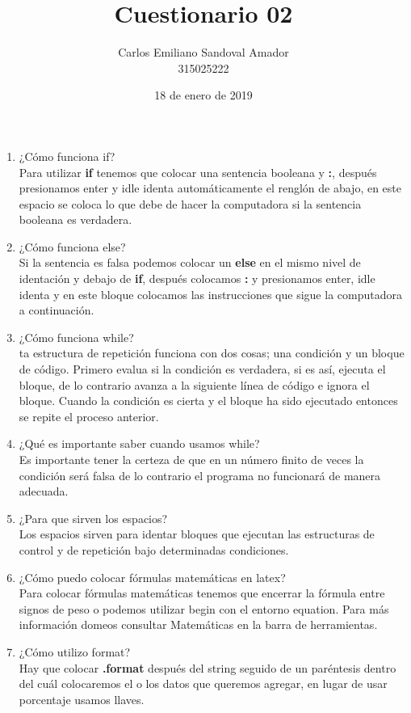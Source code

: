 \documentclass[letterpaper, 12pt, oneside]{article}%
\title{Cuestionario 02}
\author{Carlos Emiliano Sandoval Amador \\ 315025222}
\date{18 de enero de 2019}
\begin{document}
	\maketitle
	\begin{enumerate} %
		\item ¿Cómo funciona if? \\ Para utilizar \textbf{if} tenemos que colocar una sentencia booleana y \textbf{:}, después presionamos enter y idle identa automáticamente el renglón de abajo, en este espacio se coloca lo que debe de hacer la computadora si la sentencia booleana es verdadera.
		\item ¿Cómo funciona else? \\ Si la sentencia es falsa podemos colocar un \textbf{else} en el mismo nivel de identación y debajo de \textbf{if}, después colocamos \textbf{:} y presionamos enter, idle identa y en este bloque colocamos las instrucciones que sigue la computadora a continuación.
		\item ¿Cómo funciona while? \\ ta estructura de repetición funciona con dos cosas; una condición y un bloque de código. Primero evalua si la condición es verdadera, si es así, ejecuta el bloque, de lo contrario avanza a la siguiente línea de código e ignora el bloque. Cuando la condición es cierta y el bloque ha sido ejecutado entonces se repite el proceso anterior.
		\item ¿Qué es importante saber cuando usamos while? \\ Es importante tener la certeza de que en un número finito de veces la condición será falsa de lo contrario el programa no funcionará de manera adecuada.
		\item ¿Para que sirven los espacios? \\ Los espacios sirven para identar bloques que ejecutan las estructuras de control y de repetición bajo determinadas condiciones. 
		\item ¿Cómo puedo colocar fórmulas matemáticas en latex? \\ Para colocar fórmulas matemáticas tenemos que encerrar la fórmula entre signos de peso o podemos utilizar begin con el entorno equation. Para más información domeos consultar Matemáticas en la barra de herramientas.
		\item ¿Cómo utilizo format? \\ Hay que colocar \textbf{.format} después del string seguido de un paréntesis dentro del cuál colocaremos el o los datos que queremos agregar, en lugar de usar porcentaje usamos llaves.

\end{enumerate}
\end{document}
